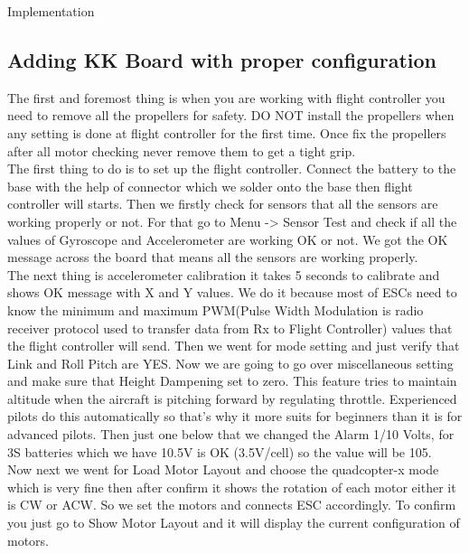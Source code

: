 \documentclass[12pt, oneside]{report}
\numberwithin{equation}{section}
\begin{document}
\begin{chapter}{Implementation}
\subsection{Adding KK Board with proper configuration}
The first and foremost thing is when you are working with flight controller you need to remove all the propellers for safety. DO NOT install the propellers when any setting is done at flight controller for the first time. Once fix the propellers after all motor checking never remove them to get a tight grip. \\
    The first thing to do is to set up the flight controller. Connect the battery to the base with the help of connector which we solder onto the base then flight controller will starts. Then we firstly check for sensors that all the sensors are working properly or not. For that go to Menu -> Sensor Test and check if all the values of Gyroscope and Accelerometer are working OK or not. We got the OK message across the board that means all the sensors are working properly. \\
    The next thing is accelerometer calibration it takes 5 seconds to calibrate and shows OK message with X and Y values. We do it because most of ESCs need to know the minimum and maximum PWM(Pulse Width Modulation is radio receiver protocol used to transfer data from Rx to Flight Controller) values that the flight controller will send. Then we went for mode setting and just verify that Link and Roll Pitch are YES. Now we are going to go over miscellaneous setting and make sure that Height Dampening set to zero. This feature tries to maintain altitude when the aircraft is pitching forward by regulating throttle. Experienced pilots do this automatically so that’s why it more suits for beginners than it is for advanced pilots. Then just one below that we changed the Alarm 1/10 Volts, for 3S batteries which we have 10.5V is OK (3.5V/cell) so the value will be 105. \\
    Now next we went for Load Motor Layout and choose the quadcopter-x mode which is very fine then after confirm it shows the rotation of each motor either it is CW or ACW. So we set the motors and connects ESC accordingly. To confirm you just go to Show Motor Layout and it will display the current configuration of motors.\\

\end{chapter}
\end{document}
